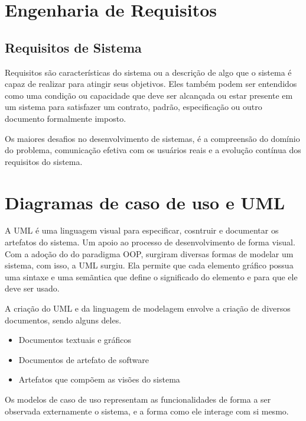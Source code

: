 \documentclass[12pt a4paper]{paper}
\begin{document}
  
\section{Engenharia de Requisitos} %
\label{sec:Engenharia de Requisitos}
\subsection{Requisitos de Sistema} %
\label{sub:Requisitos de Sistema}
Requisitos são características do sistema ou a descrição de algo que o sistema é capaz 
de realizar para atingir seus objetivos.
Eles também podem ser entendidos como uma condição ou capacidade que deve ser 
alcançada ou estar presente em um sistema para satisfazer um contrato, padrão, 
especificação ou outro documento formalmente imposto.

Os maiores desafios no desenvolvimento de sistemas, é a compreensão do domínio do 
problema, comunicação efetiva com os usuários reais e a evolução contínua dos 
requisitos do sistema.

\section{Diagramas de caso de uso e UML} %
\label{sec:Diagramas de caso de uso e UML}
A UML é uma linguagem visual para especificar, cosntruir e documentar os artefatos do 
sistema. Um apoio ao processo de desenvolvimento de forma visual.
Com a adoção do do paradigma OOP, surgiram diversas formas de modelar um sistema, com 
isso, a UML surgiu. Ela permite que cada elemento gráfico possua uma sintaxe e uma 
semãntica que define o significado do elemento e para que ele deve ser usado. 

A criação do UML e da linguagem de modelagem envolve a criação de diversos documentos, 
sendo alguns deles. 

\begin{itemize}
  \item Documentos textuais e gráficos 
  \item Documentos de artefato de software 
  \item Artefatos que compõem as visões do sistema 
\end{itemize}

Os modelos de caso de uso representam as funcionalidades de forma a ser observada 
externamente o sistema, e a forma como ele interage com si mesmo. 
\end{document}
